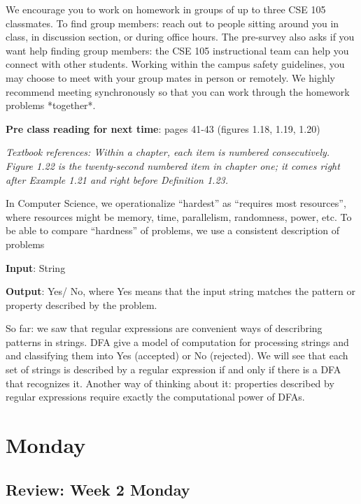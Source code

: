 We encourage you to work on homework in groups of up to three CSE 105 classmates. 
To find group members: reach out to people sitting around you in class, in discussion section, 
or during office hours. The pre-survey also asks if you want help finding group members: 
the CSE 105 instructional team can help you connect with other students. Working within the 
campus safety guidelines, you may choose to meet with your group mates in person or remotely. 
We highly recommend meeting synchronously so that you can work through the homework problems *together*. 

{\bf Pre class reading for next time}: pages 41-43 (figures 1.18, 1.19, 1.20)

\newpage

{\it Textbook references: Within a chapter, each item is numbered consecutively. Figure 1.22
is the twenty-second numbered item in chapter one; it comes right after Example 1.21 and right before Definition 1.23.}

In Computer Science, we operationalize ``hardest'' as ``requires most resources'', where
resources might be memory, time, parallelism, randomness, power, etc.
To be able to compare ``hardness'' of problems, we use a consistent description of problems

{\bf Input}: String

{\bf Output}: Yes/ No, where Yes means that the input string matches the pattern or property described by the problem.

So far: we saw that regular expressions are convenient ways of describring patterns in strings.
DFA give a model of computation for processing strings and and classifying them into Yes (accepted)
or No (rejected). We will see that each set of strings is described by a regular expression if and only 
if there is a DFA that recognizes it.  Another way of thinking about it: properties described by regular
expressions require exactly the computational power of DFAs.


\section*{Monday}


    
\newpage
\subsection*{Review: Week 2 Monday}


